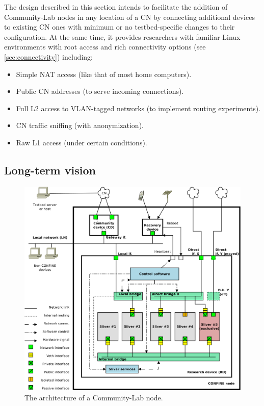 \documentclass[conference]{IEEEtran}
\begin{document}
The design described in this section intends to facilitate the addition of
Community-Lab nodes in any location of a CN by connecting additional devices to
existing CN ones with minimum or no testbed-specific changes to their
configuration.  At the same time, it provides researchers with familiar
Linux environments with root access and rich connectivity
options (see \ref{sec:connectivity}) including:

\begin{itemize}
\item Simple NAT access (like that of most home computers).
\item Public CN addresses (to serve incoming connections).
\item Full L2 access to VLAN-tagged networks (to implement routing
  experiments).
\item CN traffic sniffing (with anonymization).
\item Raw L1 access (under certain conditions).
\end{itemize}

\subsection{Long-term vision}

\begin{figure}[!t]
\centering
\includegraphics[width=\linewidth]{node-arch}
\caption{The architecture of a Community-Lab node.}
\label{fig:node-arch}
\end{figure}
\end{document}
